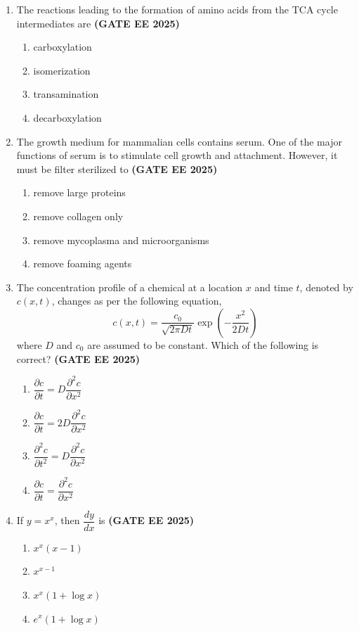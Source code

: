 \documentclass[journal,12pt,onecolumn]{IEEEtran}
\theoremstyle{remark}
\begin{document}
\begin{enumerate}
\item The reactions leading to the formation of amino acids from the TCA cycle intermediates are  \hfill \textbf{(GATE EE 2025)}
\begin{enumerate} 
\item carboxylation
\item isomerization
\item transamination
\item decarboxylation
\end{enumerate}

\item The growth medium for mammalian cells contains serum. One of the major functions of serum is to stimulate cell growth and attachment. However, it must be filter sterilized to  \hfill \textbf{(GATE EE 2025)}
\begin{enumerate} 
\item remove large proteins
\item remove collagen only
\item remove mycoplasma and microorganisms
\item remove foaming agents
\end{enumerate}
\item The concentration profile of a chemical at a location $x$ and time $t$, denoted by $c(x,t)$, changes as per the following equation,
\[
c(x,t) = \frac{c_0}{\sqrt{2 \pi D t}} \exp \left( - \frac{x^2}{2Dt} \right)
\]
where $D$ and $c_0$ are assumed to be constant. Which of the following is correct? \hfill \textbf{(GATE EE 2025)}
\begin{enumerate}
\item  $\dfrac{\partial c}{\partial t} = D \dfrac{\partial^2 c}{\partial x^2}$
\item  $\dfrac{\partial c}{\partial t} = 2D \dfrac{\partial^2 c}{\partial x^2}$
\item  $\dfrac{\partial^2 c}{\partial t^2} = D \dfrac{\partial^2 c}{\partial x^2}$
\item  $\dfrac{\partial c}{\partial t} = \dfrac{\partial^2 c}{\partial x^2}$
\end{enumerate}

\item If $y = x^x$, then $\dfrac{dy}{dx}$ is \hfill \textbf{(GATE EE 2025)}
\begin{enumerate}
\item  $x^x(x-1)$
\item  $x^{x-1}$
\item  $x^x (1 + \log x)$
\item  $e^x (1 + \log x)$
\end{enumerate}


\end{enumerate}
\end{document}
